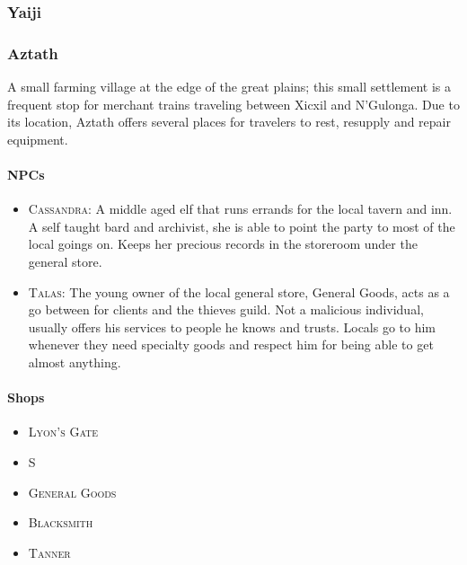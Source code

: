 		\subsubsection{Yaiji}

		\subsubsection{Aztath}

		A small farming village at the edge of the great plains; this small 
		settlement is a frequent stop for merchant trains traveling between 
		Xicxil and N'Gulonga.  Due to its location, Aztath offers several 
		places for travelers to rest, resupply and repair equipment.  

			\paragraph{NPCs}
			
				\begin{itemize}
					\item \textsc{Cassandra}: A middle aged elf that runs 
							errands for the local tavern and inn.
							A self taught bard and archivist, she
							is able to point the party to most of
							the local goings on.  Keeps her precious
							records in the storeroom under the
							general store. 
					\item \textsc{Talas}: The young owner of the local
							general store, General Goods, acts as a 
							go between for clients and the thieves 
							guild.  Not a malicious individual,
							usually offers his services to people he
							knows and trusts.  Locals go to him whenever 
							they need specialty goods and respect him
							for being able to get almost anything.  
				\end{itemize}
			\paragraph{Shops}

				\begin{itemize}
					\item \textsc{Lyon's Gate}
					\item \textsc{S}
					\item \textsc{General Goods}
					\item \textsc{Blacksmith}
					\item \textsc{Tanner}
				\end{itemize}

